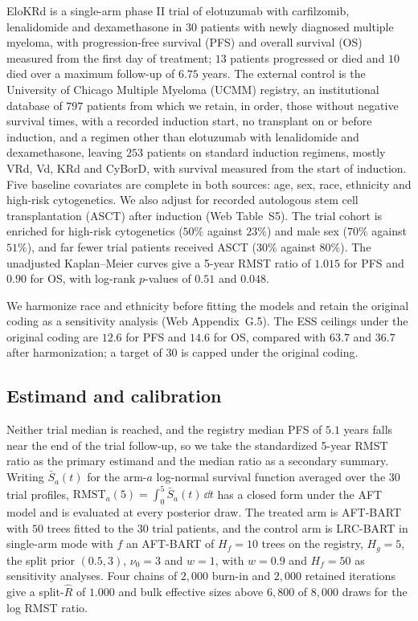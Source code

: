 EloKRd is a single-arm phase II trial of elotuzumab with carfilzomib, lenalidomide and dexamethasone in $30$ patients with newly diagnosed multiple myeloma, with progression-free survival (PFS) and overall survival (OS) measured from the first day of treatment; $13$ patients progressed or died and $10$ died over a maximum follow-up of $6.75$ years. The external control is the University of Chicago Multiple Myeloma (UCMM) registry, an institutional database of $797$ patients from which we retain, in order, those without negative survival times, with a recorded induction start, no transplant on or before induction, and a regimen other than elotuzumab with lenalidomide and dexamethasone, leaving $253$ patients on standard induction regimens, mostly VRd, Vd, KRd and CyBorD, with survival measured from the start of induction. Five baseline covariates are complete in both sources: age, sex, race, ethnicity and high-risk cytogenetics. We also adjust for recorded autologous stem cell transplantation (ASCT) after induction (Web Table~S5). The trial cohort is enriched for high-risk cytogenetics ($50\%$ against $23\%$) and male sex ($70\%$ against $51\%$), and far fewer trial patients received ASCT ($30\%$ against $80\%$). The unadjusted Kaplan--Meier curves give a 5-year RMST ratio of $1.015$ for PFS and $0.90$ for OS, with log-rank $p$-values of $0.51$ and $0.048$.

We harmonize race and ethnicity before fitting the models and retain the original coding as a sensitivity analysis (Web Appendix~G.5). The ESS ceilings under the original coding are $12.6$ for PFS and $14.6$ for OS, compared with $63.7$ and $36.7$ after harmonization; a target of $30$ is capped under the original coding.

\subsection{Estimand and calibration}
\label{sec:app_est}

Neither trial median is reached, and the registry median PFS of $5.1$ years falls near the end of the trial follow-up, so we take the standardized 5-year RMST ratio as the primary estimand and the median ratio as a secondary summary. Writing $\bar S_a(t)$ for the arm-$a$ log-normal survival function averaged over the $30$ trial profiles, $\mathrm{RMST}_a(5)=\int_0^5\bar S_a(t)\,\dd t$ has a closed form under the AFT model and is evaluated at every posterior draw. The treated arm is AFT-BART with $50$ trees fitted to the $30$ trial patients, and the control arm is LRC-BART in single-arm mode with $f$ an AFT-BART of $H_f=10$ trees on the registry, $H_g=5$, the split prior $(0.5,3)$, $\nu_0=3$ and $w=1$, with $w=0.9$ and $H_f=50$ as sensitivity analyses. Four chains of $2{,}000$ burn-in and $2{,}000$ retained iterations give a split-$\widehat R$ of $1.000$ and bulk effective sizes above $6{,}800$ of $8{,}000$ draws for the log RMST ratio.

